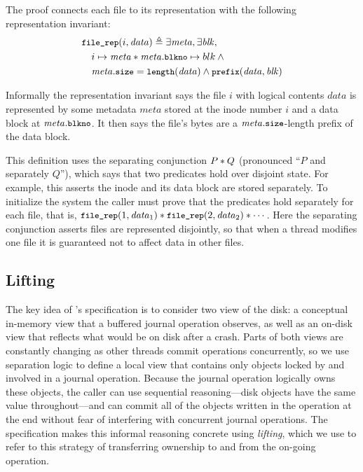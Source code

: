 The \simplenfs proof connects each file to its representation with the following
representation invariant:
%
\begin{align*}
  &\cc{file_rep}(i, \mathit{data}) \triangleq \exists \mathit{meta}, \exists \mathit{blk}, \\
  &\quad i \mapsto \mathit{meta} \sep \mathit{meta}.\cc{blkno} \mapsto blk \land \phantom{} \\
  &\quad \mathit{meta}.\cc{size} = \cc{length}(\mathit{data}) \land \cc{prefix}(\mathit{data}, \mathit{blk})
\end{align*}

Informally the representation invariant says the file $i$ with logical contents $\mathit{data}$ is represented by some
metadata $\mathit{meta}$ stored at the inode number $i$ and a data block at
$\mathit{meta}.\cc{blkno}$. It then says the file's bytes are a
$\mathit{meta}.\cc{size}$-length prefix of the data block.

This definition uses the separating conjunction $P * Q$ (pronounced ``$P$ and
separately $Q$''), which says that two predicates hold over disjoint state.
For example, this asserts the inode and its data block are stored
separately. To initialize the system the caller must prove that the
 predicates hold separately for each file, that is,
$\cc{file_rep}(1, \mathit{data}_1) \sep \cc{file_rep}(2, \mathit{data}_2) \sep \cdots$. Here the
separating conjunction asserts files are represented disjointly, so that when a
thread modifies one file it is guaranteed not to affect data in other files.

\subsection{Lifting}
\label{s:design:lifting}

\newcommand{\bufobjDurable}{\cc{durable_pred}\xspace}

The key idea of \txn's specification is to consider two view of the disk: a
conceptual in-memory view that a buffered journal operation observes, as well as
an on-disk view that reflects what would be on disk after a crash. Parts of both views are constantly changing as
other threads commit operations concurrently, so we use separation logic to
define a local view that contains only objects locked by and involved in a
journal operation. Because the journal operation logically owns these objects, the caller
can use sequential reasoning---disk objects have the same value throughout---and can commit all of the objects written in the operation at
the end without fear of interfering with concurrent journal operations. The
specification makes this informal reasoning concrete using \emph{lifting}, which
we use to refer to this strategy of transferring ownership to and from the
on-going operation.

